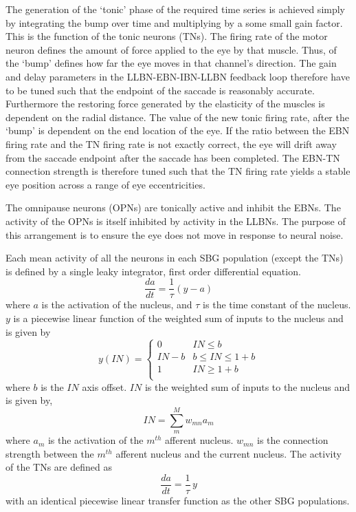 \documentclass{frontiersSCNS}
\begin{document}
The generation of the `tonic' phase of the required time series is
achieved simply by integrating the bump over time and multiplying by a
some small gain factor.  This is the function of the tonic neurons
(TNs).  The firing rate of the motor neuron defines the amount of
force applied to the eye by that muscle.  Thus, 
of the `bump'
defines how far the eye moves in that channel's direction.  The gain
and delay parameters in the LLBN-EBN-IBN-LLBN feedback loop therefore
have to be tuned such that the endpoint of the saccade is reasonably
accurate.  Furthermore the restoring force generated by the elasticity
of the muscles is dependent on the radial distance.  The value of the
new tonic firing rate, after the `bump' is dependent on the end
location of the eye.  If the ratio between the EBN firing rate and the
TN firing rate is not exactly correct, the eye will drift away from
the saccade endpoint after the saccade has been completed.  The EBN-TN
connection strength is therefore tuned such that the TN firing rate
yields a stable eye position across a range of eye eccentricities.

The omnipause neurons (OPNs) are tonically active and inhibit the
EBNs.  The activity of the OPNs is itself inhibited by activity in the
LLBNs.  The purpose of this arrangement is to ensure the eye does not
move in response to neural noise.

Each mean activity of all the neurons in each SBG population (except
the TNs) is defined by a single leaky integrator, first order
differential equation.
\begin{equation}\label{eq:LIN}
   \frac{da}{dt} = \frac{1}{\tau}(y-a)
\end{equation}
where $a$ is the activation of the nucleus, and $\tau$ is the time
constant of the nucleus. $y$ is a piecewise linear function of the
weighted sum of inputs to the nucleus and is given by
\begin{equation}
       y(IN) = \begin{cases}
       0    & IN \leq b \\
      IN-b   & b \leq IN \leq 1+b \\
      1   & IN \geq 1+b \\
   \end{cases}
\end{equation}
where $b$ is the $IN$ axis offset.  $IN$ is the weighted sum of inputs
to the nucleus and is given by,
\begin{equation}
    IN = \sum_{m}^{M} w_{mn} a_{m}
\end{equation}
where $a_{m}$ is the activation of the $m^{th}$ afferent nucleus.
$w_{mn}$ is the connection strength between the $m^{th}$ afferent
nucleus and the current nucleus. The activity of the TNs are defined
as
\begin{equation}
   \frac{da}{dt} = \frac{1}{\tau}\,y
\end{equation}
with an identical piecewise linear transfer function as the other SBG
populations.
\end{document}
